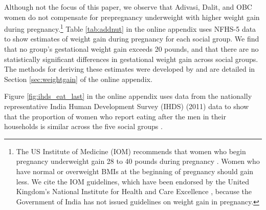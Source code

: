 

Although not the focus of this paper, we observe that Adivasi, Dalit, and OBC women do not compensate for prepregnancy underweight with higher weight gain during pregnancy.\footnote{The US Institute of Medicine (IOM) recommends that women who begin pregnancy underweight gain 28 to 40 pounds during pregnancy \citep{iom2009weightgain}. Women who have normal or overweight BMIs at the beginning of pregnancy should gain less.  We cite the IOM guidelines, which have been endorsed by the United Kingdom's National Institute for Health and Care Excellence \citep{NICE2025}, because the Government of India has not issued guidelines on weight gain in pregnancy.}  Table \ref{tab:addnut} in the online appendix uses NFHS-5 data to show estimates of weight gain during pregnancy for each social group. We find that no group's gestational weight gain exceeds 20 pounds, and that there are no statistically significant differences in gestational weight gain across social groups. The methods for deriving these estimates were developed by \cite{coffey2015prepregnancy} and are detailed in Section \ref{sec:weightgain} of the online appendix.

Figure \ref{fig:ihds_eat_last} in the online appendix uses data from the nationally representative India Human Development Survey (IHDS) (2011) data to show that the proportion of women who report eating after the men in their households is similar across the five social groups \cite{DesaiVannemanIHDS2011}.


